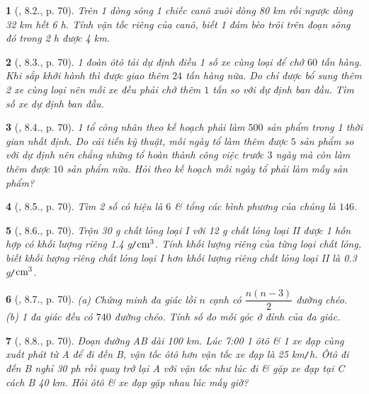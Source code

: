 \documentclass{article}
\newtheorem{baitoan}{}
\begin{document}
\begin{baitoan}[\cite{Binh_boi_duong_Toan_9_tap_2}, 8.2., p. 70]
	Trên 1 dòng sông 1 chiếc canô xuôi dòng {\rm80 km} rồi ngược dòng {\rm32 km} hết {\rm6 h}. Tính vận tốc riêng của canô, biết 1 đám bèo trôi trên đoạn sông đó trong {\rm2 h} được {\rm4 km}.
\end{baitoan}

\begin{baitoan}[\cite{Binh_boi_duong_Toan_9_tap_2}, 8.3., p. 70]
	1 đoàn ôtô tải dự định điều 1 số xe cùng loại để chở $60$ tấn hàng. Khi sắp khởi hành thì được giao thêm $24$ tấn hàng nữa. Do chỉ được bổ sung thêm 2 xe cùng loại nên mỗi xe đều phải chở thêm $1$ tấn so với dự định ban đầu. Tìm số xe dự định ban đầu.
\end{baitoan}

\begin{baitoan}[\cite{Binh_boi_duong_Toan_9_tap_2}, 8.4., p. 70]
	1 tổ công nhân theo kế hoạch phải làm $500$ sản phẩm trong 1 thời gian nhất định. Do cải tiến kỹ thuật, mỗi ngày tổ làm thêm được $5$ sản phẩm so với dự định nên chẳng những tổ hoàn thành công việc trước $3$ ngày mà còn làm thêm được $10$ sản phẩm nữa. Hỏi theo kế hoạch mỗi ngày tổ phải làm mấy sản phẩm?
\end{baitoan}

\begin{baitoan}[\cite{Binh_boi_duong_Toan_9_tap_2}, 8.5., p. 70]
	Tìm 2 số có hiệu là $6$ \& tổng các bình phương của chúng là $146$.
\end{baitoan}

\begin{baitoan}[\cite{Binh_boi_duong_Toan_9_tap_2}, 8.6., p. 70]
	Trộn {\rm30 g} chất lỏng loại I với {\rm12 g} chất lỏng loại II được 1 hỗn hợp có khối lượng riêng {\rm1.4 g{\tt/}$\rm cm^3$}. Tính khối lượng riêng của từng loại chất lỏng, biết khối lượng riêng chất lỏng loại I hơn khối lượng riêng chất lỏng loại II là {\rm0.3 g{\tt/}$\rm cm^3$}.
\end{baitoan}

\begin{baitoan}[\cite{Binh_boi_duong_Toan_9_tap_2}, 8.7., p. 70]
	(a) Chứng minh đa giác lồi $n$ cạnh có $\dfrac{n(n - 3)}{2}$ đường chéo. (b) 1 đa giác đều có $740$ đường chéo. Tính số đo mỗi góc ở đỉnh của đa giác.
\end{baitoan}

\begin{baitoan}[\cite{Binh_boi_duong_Toan_9_tap_2}, 8.8., p. 70]
	Đoạn đường AB dài {\rm100 km}. Lúc {\rm7:00} 1 ôtô \& 1 xe đạp cùng xuất phát từ A để đi đến B, vận tốc ôtô hơn vận tốc xe đạp là {\rm25 km{\tt/}h}. Ôtô đi đến B nghỉ {\rm30 ph} rồi quay trở lại A với vận tốc như lúc đi \& gặp xe đạp tại C cách B {\rm40 km}. Hỏi ôtô \& xe đạp gặp nhau lúc mấy giờ?
\end{baitoan}
\end{document}
